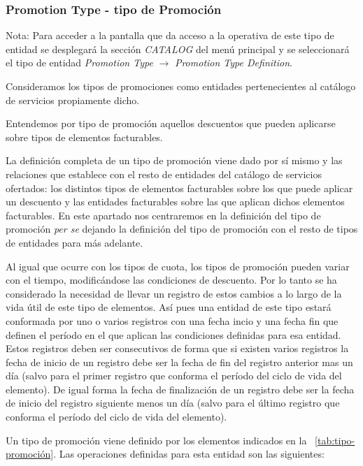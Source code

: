 \subsubsection{Promotion Type - tipo de Promoción}
\label{sub:promotion-type}

Nota: Para acceder a la pantalla que da acceso a la operativa de este tipo de entidad se desplegará la sección \emph{CATALOG} del menú principal y se seleccionará el tipo de entidad \emph{Promotion Type} $\rightarrow$  \emph{Promotion Type Definition}.

Consideramos los tipos de promociones como entidades pertenecientes al catálogo de servicios propiamente dicho.

Entendemos por tipo de promoción aquellos descuentos que pueden aplicarse sobre tipos de elementos facturables.

La definición completa de un tipo de promoción viene dado por sí mismo y las relaciones que establece con el resto de entidades del catálogo de servicios ofertados: los distintos tipos de elementos facturables sobre los que puede aplicar un descuento y las entidades facturables sobre las que aplican dichos elementos facturables.  En este apartado nos centraremos en la definición del tipo de promoción \textit{per se} dejando la definición del tipo de promoción con el resto de tipos de entidades para más adelante.

Al igual que ocurre con los tipos de cuota, los tipos de promoción pueden variar con el tiempo, modificándose las condiciones de descuento. Por lo tanto se ha considerado la necesidad de llevar un registro de estos cambios a lo largo de la vida útil de este tipo de elementos. Así pues una entidad de este tipo estará conformada por uno o varios registros con una fecha incio y una fecha fin que definen el período en el que aplican las condiciones definidas para esa entidad. Estos registros deben ser consecutivos de forma que si existen varios registros la fecha de inicio de un registro debe ser la fecha de fin del registro anterior mas un día (salvo para el primer registro que conforma el período del ciclo de vida del elemento). De igual forma la fecha de finalización de un registro debe ser la fecha de inicio del registro siguiente menos un día (salvo para el último registro que conforma el período del ciclo de vida del elemento).


Un tipo de promoción viene definido por los elementos indicados en la \tablename~\ref{tab:tipo-promoción}.
Las operaciones definidas para esta entidad son las siguientes:

